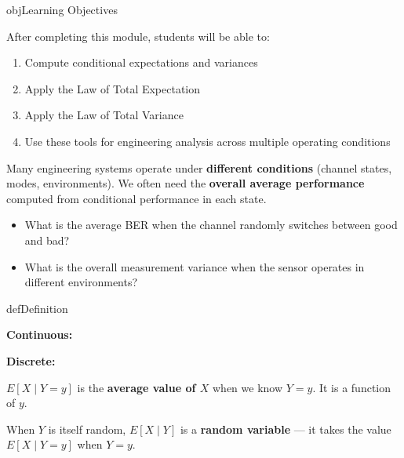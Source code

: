 \begin{PSbox}[unbreakable]{obj}{Learning Objectives}

After completing this module, students will be able to:

\begin{enumerate}
\def\labelenumi{\arabic{enumi}.}
\tightlist
\item
  Compute conditional expectations and variances
\item
  Apply the Law of Total Expectation
\item
  Apply the Law of Total Variance
\item
  Use these tools for engineering analysis across multiple operating conditions
\end{enumerate}

\end{PSbox}


Many engineering systems operate under \textbf{different conditions} (channel states, modes, environments). We often need the \textbf{overall average performance} computed from conditional performance in each state.

\begin{itemize}
\tightlist
\item
  What is the average BER when the channel randomly switches between good and bad?
\item
  What is the overall measurement variance when the sensor operates in different environments?
\end{itemize}


\begin{PSbox}[unbreakable]{def}{Definition}

\textbf{Continuous:}

\textbf{Discrete:}

\end{PSbox}


$E[X \mid Y = y]$ is the \textbf{average value of $X$} when we know $Y = y$. It is a function of $y$.


When $Y$ is itself random, $E[X \mid Y]$ is a \textbf{random variable} — it takes the value $E[X \mid Y = y]$ when $Y = y$.

